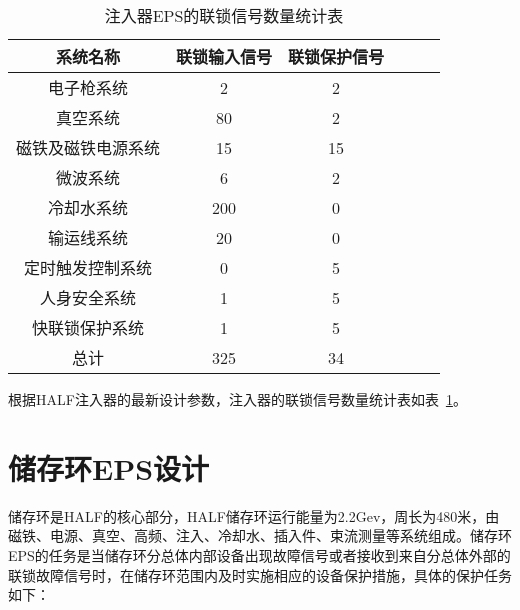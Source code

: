 \begin{table}[hbt]
  \centering
  \caption{注入器EPS的联锁信号数量统计表}
  \label{table:4.2} 
  \begin{center}
  \begin{tabular}{cccccc}
    \toprule

     系统名称&联锁输入信号&联锁保护信号\\
    \midrule
    电子枪系统& 2& 2 \\
    
    真空系统  & 80 & 2 \\
    
    磁铁及磁铁电源系统 &15 & 15\\
    
    微波系统 &6  &2 \\
    
    冷却水系统  &200& 0\\

    输运线系统& 20& 0\\
    
    定时触发控制系统 &0 & 5\\
    
    人身安全系统& 1& 5\\

    快联锁保护系统&1& 5\\

    总计&325& 34\\

    \bottomrule
  \end{tabular}
\end{center}
\end{table}

根据HALF注入器的最新设计参数，注入器的联锁信号数量统计表如表~\ref{table:4.2}。

\section{储存环EPS设计}

储存环是HALF的核心部分，HALF储存环运行能量为2.2Gev，周长为480米，由磁铁、电源、真空、高频、注入、冷却水、插入件、束流测量等系统组成。储存环EPS的任务是当储存环分总体内部设备出现故障信号或者接收到来自分总体外部的联锁故障信号时，在储存环范围内及时实施相应的设备保护措施，具体的保护任务如下：

